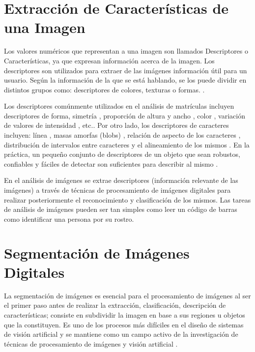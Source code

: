 \section{Extracción de Características de una Imagen}

Los valores numéricos que representan a una imagen son llamados Descriptores o Características, ya que expresan información acerca de la imagen. Los descriptores son utilizados para extraer de las imágenes información útil para un usuario. Según la información de la que se está hablando, se los puede dividir en distintos grupos como: descriptores de colores, texturas o formas. \cite{Deselaers2008-zg}.

Los descriptores comúnmente utilizados en el análisis de matrículas incluyen descriptores de forma, simetría \cite{Kim2001-yv}, proporción de altura y ancho \cite{Naito2000-im}, color \cite{Kim1996-js}, variación de valores de intensidad \cite{Draghici1997-gz}, etc.. Por otro lado, los descriptores de caracteres incluyen: línea \cite{Yu2000-tm}, masas amorfas (blobs) \cite{Hontani2001-lk}, relación de aspecto de los caracteres \cite{Hermida1997-ds}, distribución de intervalos entre caracteres \cite{Poon1995-pw} y el alineamiento de los mismos \cite{Soh1994-mc}. En la práctica, un pequeño conjunto de descriptores de un objeto que sean robustos, confiables y fáciles de detectar son suficientes para describir al mismo \cite{Chang2004-kg}. 

En el análisis de imágenes se extrae descriptores (información relevante de las imágenes) a través de técnicas de procesamiento de imágenes digitales para realizar posteriormente el reconocimiento y clasificación de los mismos. Las tareas de análisis de imágenes pueden ser tan simples como leer un código de barras como identificar una persona por su rostro. \cite{Solomon2011-xz}


\section{Segmentación de Imágenes Digitales}

La segmentación de imágenes es esencial para el procesamiento de imágenes al ser el primer paso antes de realizar la extracción, clasificación, descripción de características; consiste en subdividir la imagen en base a sus regiones u objetos que la constituyen. Es uno de los procesos más difíciles en el diseño de sistemas de visión artificial y se mantiene como un campo activo de la investigación de técnicas de procesamiento de imágenes y visión artificial \cite{Solomon2011-xz}.

